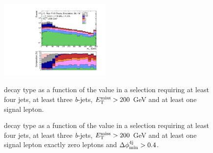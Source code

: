 \begin{figure}[h!]
\centering 
\includegraphics[width=0.49\textwidth]{figures/susy_common/mc_stack_mT_1L_3b_tt_dec.pdf}
\caption{\ttbar decay type as a function of the \mt value  in a selection requiring at least four jets, at least three \textit{b}-jets, $E_{\rm T}^{\mathrm{miss}}>200$ GeV and at least one signal lepton.}\label{fig:ttbar_decay_mT_1L}

\caption{\ttbar decay type as a function of the \mtb value  in a selection requiring at least four jets, at least three \textit{b}-jets, $E_{\rm T}^{\mathrm{miss}}>200$ GeV and  at least one signal lepton  exactly zero leptons and $\Delta\phi_{\rm{min}}^{4{\rm{j}}} > 0.4$.}\label{fig:ttbar_decay_mTb_min}
\end{figure}

